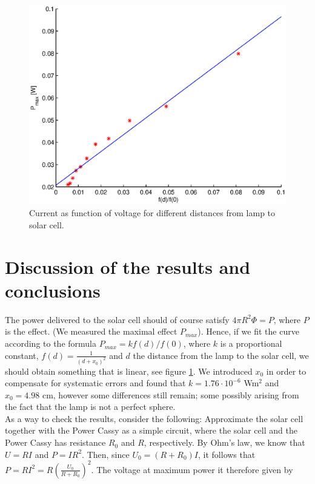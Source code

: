 \documentclass[a4paper]{article}
\begin{document}
\begin{figure}[!h]
  \begin{center}
    \includegraphics[scale=0.6]{pmaxvsf.eps}
  \end{center}
  \caption{Current as function of voltage for different distances from lamp to solar cell.}
  \label{pmaxvsf}
\end{figure}
\vfill
\clearpage

\section{Discussion of the results and conclusions}

The power delivered to the solar cell should of course satisfy $4\pi R^2\Phi = P$, where $P$ is the effect. (We measured the maximal effect $P_{max}$). Hence, if we fit the curve according to the formula $P_{max}=kf(d)/f(0)$, where $k$ is a proportional constant, $f(d)=\frac{1}{(d+x_0)^2}$ and $d$ the distance from the lamp to the solar cell, we should obtain something that is linear, see figure \ref{pmaxvsf}. We introduced $x_0$ in order to compensate for systematic errors and found that $k=1.76\cdot 10^{-6}$ Wm${}^2$ and $x_0=4.98$ cm, however some differences still remain; some possibly arising from the fact that the lamp is not a perfect sphere. \\

As a way to check the results, consider the following: Approximate the solar cell together with the Power Cassy as a simple circuit, where the solar cell and the Power Cassy has resistance $R_0$ and $R$, respectively. 
By Ohm's law, we know that $U=RI$ and $P=IR^2$. Then, since $U_0=(R+R_0)I$, it follows that $P=RI^2=R\left( \frac{U_0}{R+R_0} \right)^2$.
The voltage at maximum power it therefore given by
\end{document}
